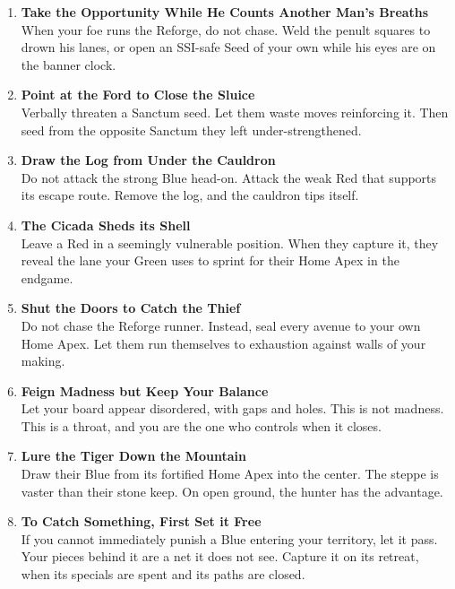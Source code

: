 \documentclass[11pt]{article}
\begin{document}
\begin{enumerate}[leftmargin=*,label=\textbf{\arabic*.}]
\item \textbf{Take the Opportunity While He Counts Another Man's Breaths}\\
When your foe runs the Reforge, do not chase. Weld the penult squares to drown his lanes, or open an SSI-safe Seed of your own while his eyes are on the banner clock.

\item \textbf{Point at the Ford to Close the Sluice}\\
Verbally threaten a Sanctum seed. Let them waste moves reinforcing it. Then seed from the opposite Sanctum they left under-strengthened.

\item \textbf{Draw the Log from Under the Cauldron}\\
Do not attack the strong Blue head-on. Attack the weak Red that supports its escape route. Remove the log, and the cauldron tips itself.

\item \textbf{The Cicada Sheds its Shell}\\
Leave a Red in a seemingly vulnerable position. When they capture it, they reveal the lane your Green uses to sprint for their Home Apex in the endgame.

\item \textbf{Shut the Doors to Catch the Thief}\\
Do not chase the Reforge runner. Instead, seal every avenue to your own Home Apex. Let them run themselves to exhaustion against walls of your making.

\item \textbf{Feign Madness but Keep Your Balance}\\
Let your board appear disordered, with gaps and holes. This is not madness. This is a throat, and you are the one who controls when it closes.

\item \textbf{Lure the Tiger Down the Mountain}\\
Draw their Blue from its fortified Home Apex into the center. The steppe is vaster than their stone keep. On open ground, the hunter has the advantage.

\item \textbf{To Catch Something, First Set it Free}\\
If you cannot immediately punish a Blue entering your territory, let it pass. Your pieces behind it are a net it does not see. Capture it on its retreat, when its specials are spent and its paths are closed.


\end{enumerate}
\end{document}
